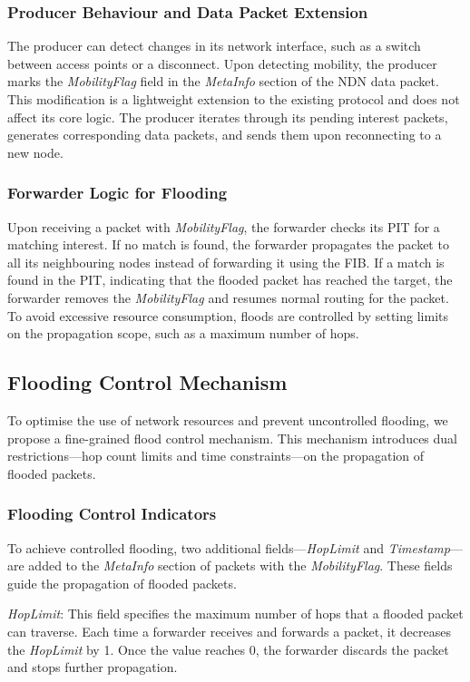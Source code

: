 \documentclass[conference]{IEEEtran}
\begin{document}
\subsubsection{Producer Behaviour and Data Packet Extension}
The producer can detect changes in its network interface, such as a switch between access points or a disconnect. Upon detecting mobility, the producer marks the \textit{MobilityFlag} field in the \textit{MetaInfo} section of the NDN data packet. This modification is a lightweight extension to the existing protocol and does not affect its core logic. The producer iterates through its pending interest packets, generates corresponding data packets, and sends them upon reconnecting to a new node.
\subsubsection{Forwarder Logic for Flooding}
Upon receiving a packet with \textit{MobilityFlag}, the forwarder checks its PIT for a matching interest. If no match is found, the forwarder propagates the packet to all its neighbouring nodes instead of forwarding it using the FIB. If a match is found in the PIT, indicating that the flooded packet has reached the target, the forwarder removes the \textit{MobilityFlag} and resumes normal routing for the packet. To avoid excessive resource consumption, floods are controlled by setting limits on the propagation scope, such as a maximum number of hops.

\subsection{Flooding Control Mechanism}
To optimise the use of network resources and prevent uncontrolled flooding, we propose a fine-grained flood control mechanism. This mechanism introduces dual restrictions—hop count limits and time constraints—on the propagation of flooded packets.
\subsubsection{Flooding Control Indicators}
To achieve controlled flooding, two additional fields—\textit{HopLimit} and \textit{Timestamp}—are added to the \textit{MetaInfo} section of packets with the \textit{MobilityFlag}. These fields guide the propagation of flooded packets.

\textit{HopLimit}: This field specifies the maximum number of hops that a flooded packet can traverse. Each time a forwarder receives and forwards a packet, it decreases the \textit{HopLimit} by 1. Once the value reaches 0, the forwarder discards the packet and stops further propagation.
\end{document}
